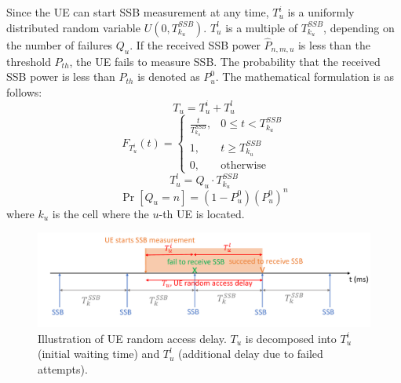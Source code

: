 Since the UE can start SSB measurement at any time, $T_u^i$ is a uniformly distributed random variable $U(0, T_{k_u}^{SSB})$. $T_u^l$ is a multiple of $T_{k_u}^{SSB}$, depending on the number of failures $Q_u$. If the received SSB power $\hat{P}_{n, m, u}$ is less than the threshold $P_{th}$, the UE fails to measure SSB. The probability that the received SSB power is less than $P_{th}$ is denoted as $P_u^0$. The mathematical formulation is as follows:
\begin{equation}
    T_u = T_u^i + T_u^l
\end{equation}
\begin{equation}
    F_{T_u^i}(t) =
    \begin{cases}
        \frac{t}{T_{k_u}^{SSB}}, & 0 \leq t < T_{k_u}^{SSB} \\
        1, & t \geq T_{k_u}^{SSB} \\
        0, & \text{otherwise}
    \end{cases}
\end{equation}
\begin{equation}
    T_u^l = Q_u \cdot T_{k_u}^{SSB}
\end{equation}
\begin{equation}
    \Pr\left[Q_u = n\right] = (1 - P_u^0) (P_u^0)^n
\end{equation}
where $k_u$ is the cell where the $u$-th UE is located.

\begin{figure}[h!]
    \centering
    \includegraphics[width=1\textwidth]{figure/random access delay.pdf}
    \caption{Illustration of UE random access delay. $T_u$ is decomposed into $T_u^i$ (initial waiting time) and $T_u^l$ (additional delay due to failed attempts).}
    \label{RAD}
\end{figure}

